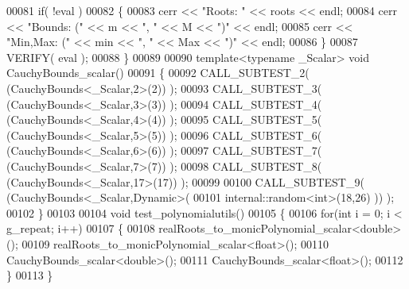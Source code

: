 \begin{DoxyCode}
00081   \textcolor{keywordflow}{if}( !eval )
00082   \{
00083     cerr << \textcolor{stringliteral}{"Roots: "} << roots << endl;
00084     cerr << \textcolor{stringliteral}{"Bounds: ("} << m << \textcolor{stringliteral}{", "} << M << \textcolor{stringliteral}{")"} << endl;
00085     cerr << \textcolor{stringliteral}{"Min,Max: ("} << min << \textcolor{stringliteral}{", "} << Max << \textcolor{stringliteral}{")"} << endl;
00086   \}
00087   VERIFY( eval );
00088 \}
00089 
00090 \textcolor{keyword}{template}<\textcolor{keyword}{typename} \_Scalar> \textcolor{keywordtype}{void} CauchyBounds\_scalar()
00091 \{
00092   CALL\_SUBTEST\_2( (CauchyBounds<\_Scalar,2>(2)) );
00093   CALL\_SUBTEST\_3( (CauchyBounds<\_Scalar,3>(3)) );
00094   CALL\_SUBTEST\_4( (CauchyBounds<\_Scalar,4>(4)) );
00095   CALL\_SUBTEST\_5( (CauchyBounds<\_Scalar,5>(5)) );
00096   CALL\_SUBTEST\_6( (CauchyBounds<\_Scalar,6>(6)) );
00097   CALL\_SUBTEST\_7( (CauchyBounds<\_Scalar,7>(7)) );
00098   CALL\_SUBTEST\_8( (CauchyBounds<\_Scalar,17>(17)) );
00099 
00100   CALL\_SUBTEST\_9( (CauchyBounds<\_Scalar,Dynamic>(
00101           internal::random<int>(18,26) )) );
00102 \}
00103 
00104 \textcolor{keywordtype}{void} test\_polynomialutils()
00105 \{
00106   \textcolor{keywordflow}{for}(\textcolor{keywordtype}{int} i = 0; i < g\_repeat; i++)
00107   \{
00108     realRoots\_to\_monicPolynomial\_scalar<double>();
00109     realRoots\_to\_monicPolynomial\_scalar<float>();
00110     CauchyBounds\_scalar<double>();
00111     CauchyBounds\_scalar<float>();
00112   \}
00113 \}
\end{DoxyCode}
